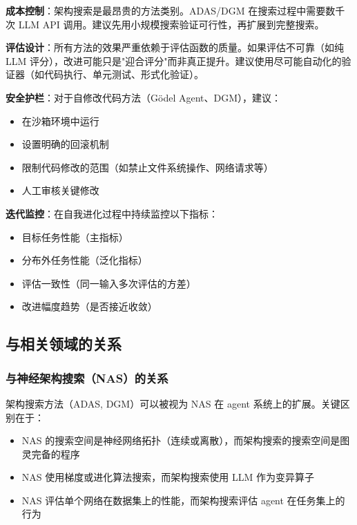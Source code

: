 \textbf{成本控制}：架构搜索是最昂贵的方法类别。ADAS/DGM 在搜索过程中需要数千次 LLM API 调用。建议先用小规模搜索验证可行性，再扩展到完整搜索。

\textbf{评估设计}：所有方法的效果严重依赖于评估函数的质量。如果评估不可靠（如纯 LLM 评分），改进可能只是"迎合评分"而非真正提升。建议使用尽可能自动化的验证器（如代码执行、单元测试、形式化验证）。

\textbf{安全护栏}：对于自修改代码方法（Gödel Agent、DGM），建议：
\begin{itemize}
\item 在沙箱环境中运行
\item 设置明确的回滚机制
\item 限制代码修改的范围（如禁止文件系统操作、网络请求等）
\item 人工审核关键修改
\end{itemize}

\textbf{迭代监控}：在自我进化过程中持续监控以下指标：
\begin{itemize}
\item 目标任务性能（主指标）
\item 分布外任务性能（泛化指标）
\item 评估一致性（同一输入多次评估的方差）
\item 改进幅度趋势（是否接近收敛）
\end{itemize}

\subsection{与相关领域的关系}\label{sec:ch3-related}

\subsubsection{与神经架构搜索（NAS）的关系}

架构搜索方法（ADAS, DGM）可以被视为 NAS 在 agent 系统上的扩展。关键区别在于：
\begin{itemize}
\item NAS 的搜索空间是神经网络拓扑（连续或离散），而架构搜索的搜索空间是图灵完备的程序
\item NAS 使用梯度或进化算法搜索，而架构搜索使用 LLM 作为变异算子
\item NAS 评估单个网络在数据集上的性能，而架构搜索评估 agent 在任务集上的行为
\end{itemize}

